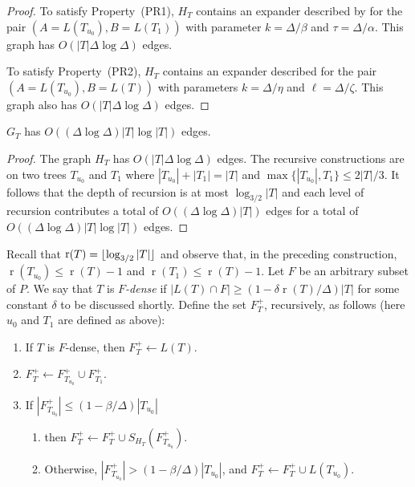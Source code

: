 \documentclass{patmorin}
\DeclareMathOperator{\rank}{r}
\begin{document}
\begin{proof}
  To satisfy Property~(PR1), $H_T$ contains an expander described
  by  for the pair $(A=L(T_{u_0}),B=L(T_1))$ with
  parameter $k=\Delta/\beta$ and $\tau=\Delta/\alpha$.  This graph has
  $O(|T|\Delta\log\Delta)$ edges.

  To satisfy Property~(PR2), $H_T$ contains an expander described
   for the pair $(A=L(T_{u_0}),B=L(T))$ with
  parameters $k=\Delta/\eta$ and $\ell=\Delta/\zeta$. This graph also
  has $O(|T|\Delta\log\Delta)$ edges.
\end{proof}


\begin{clm}
  $G_{T}$ has $O((\Delta\log\Delta)|T|\log |T|)$ edges.
\end{clm}

\begin{proof}
  The graph $H_T$ has
  $O(|T|\Delta\log\Delta)$ edges.  The recursive constructions are on two trees $T_{u_0}$
  and $T_1$ where $|T_{u_0}|+|T_1|=|T|$ and $\max\{|T_{u_0}|,T_1\}\le
  2|T|/3$. It follows that the depth of recursion is at most
  $\log_{3/2}|T|$ and each level of recursion contributes a total of
  $O((\Delta\log\Delta)|T|)$ edges for a total of $O((\Delta\log\Delta)|T|\log|T|)$ edges.
\end{proof}

Recall that $\rank(T)=\floor{\log_{3/2} |T|}$ and observe that, in
the preceding construction, $\rank(T_{u_0}) \le \rank(T)-1$ and
$\rank(T_1)\le\rank(T)-1$.  Let $F$ be an arbitrary subset of $P$.  We say
that $T$ is \emph{$F$-dense} if $|L(T)\cap F|\ge (1-\delta\rank(T)/\Delta)|T|$
for some constant $\delta$ to be discussed shortly.  Define the set
$F^+_T$, recursively, as follows (here $u_0$ and $T_1$ are defined as above):

\begin{enumerate}
  \item If $T$ is $F$-dense, then $F^+_T\gets L(T)$. 
  \item $F^+_T\gets F^+_{T_{u_0}}\cup F^+_{T_1}$. 
  \item If $|F^+_{T_{u_0}}|\le (1-\beta/\Delta)|T_{u_0}|$
  \begin{enumerate}
     \item then $F^+_T\gets F^+_T\cup S_{H_T}(F^+_{T_{u_0}})$. 
     \item Otherwise, $|F^+_{T_{u_0}}|> (1-\beta/\Delta)|T_{u_0}|$,
          and $F^+_T\gets F^+_T\cup L(T_{u_0})$.
  \end{enumerate}
\end{enumerate}
\end{document}
